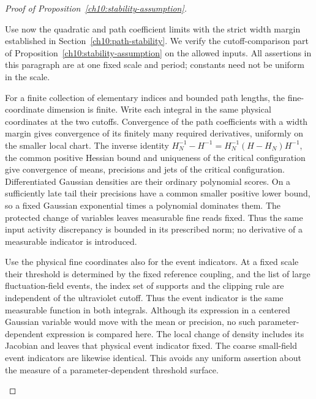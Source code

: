 \begin{proof}[Proof of Proposition~\ref{ch10:stability-assumption}]
\begin{enumerate}[label=\emph{Step \arabic*.},ref=\arabic*,leftmargin=*,align=left]
Use now the quadratic and path coefficient limits with the strict
width margin established in
Section~\ref{ch10:path-stability}. We verify the cutoff-comparison
part of Proposition~\ref{ch10:stability-assumption} on the
allowed inputs. All assertions in this paragraph are at one fixed
scale and period; constants need not be uniform in the scale.

For a finite collection of elementary indices and bounded path lengths,
the fine-coordinate dimension is finite. Write each integral in the
same physical coordinates at the two cutoffs. Convergence of the path
coefficients with a width margin gives convergence of its finitely
many required derivatives, uniformly on the smaller local chart.
The inverse identity
$H_N^{-1}-H^{-1}=H_N^{-1}(H-H_N)H^{-1}$, the common positive Hessian
bound and uniqueness of the critical configuration give convergence of means, precisions
and jets of the critical configuration. Differentiated Gaussian densities are their
ordinary polynomial scores. On a sufficiently late tail their
precisions have a common smaller positive lower bound, so a fixed
Gaussian exponential times a polynomial dominates them. The protected
change of variables leaves measurable fine reads fixed. Thus the
same input activity discrepancy is bounded in its prescribed norm;
no derivative of a measurable indicator is introduced.

Use the physical fine coordinates also for the event indicators. At a fixed
scale their threshold is determined by the fixed reference coupling,
and the list of large fluctuation-field events, the index set of supports and the clipping rule
are independent of the ultraviolet cutoff. Thus the event indicator is the
same measurable function in both integrals. Although its expression
in a centered Gaussian variable would move with the mean or precision,
no such parameter-dependent expression is compared here. The local change of
density includes its Jacobian and leaves that physical event indicator fixed.
The coarse small-field event indicators are likewise identical. This avoids any
uniform assertion about the measure of a parameter-dependent threshold surface.


\end{enumerate}
\end{proof}

